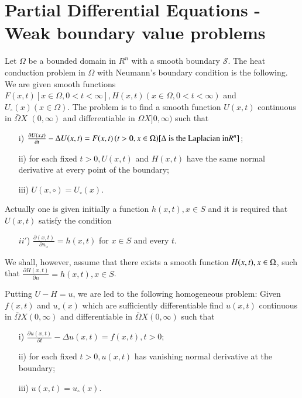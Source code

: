 
\chapter[Partial Differential Equations - Weak boundary...]{Partial Differential Equations - Weak boundary value
  problems}\label{chap10}


Let $\Omega$ be a bounded domain in $R^n$ with a smooth boundary
$\mathcal{S}$. The heat conduction problem in $\Omega$ with Neumann's
boundary condition is the following. We are given smooth functions
$F(x, t) [x \in \Omega, 0 < t < \infty], H (x, t) (x \in \Omega, 0 < t
< \infty)$ and $U_\circ (x) (x \in \Omega)$. The problem is to find a
smooth function $U(x, t)$ continuous in $\bar{\Omega} X$ $(0, \infty)$
and differentiable in $\Omega X ] 0, \infty )$ such that 
\begin{itemize}
\item [i)] $\frac{\partial U(x, t)}{\partial t}-\Delta U(x,t)=F(x,t)
 \, (t>0, x \in \Omega) [\Delta \mbox{ is the Laplacian in}\break R^n]$;
\item [ii)] for each fixed $t > 0, U(x, t)$ and $H(x, t)$ have the
  same normal derivative at every point of the boundary;
\item [iii)] $U(x, \circ) = U_\circ(x)$. 
\end{itemize}
 Actually one is
given initially a function $h(x, t), x \in S$ and it is required that
$U(x, t)$ satisfy the condition 
\begin{itemize}
\item [$ii'$)] $\frac{\partial (x, t)}{\partial n_x}= h(x, t)$ for $x
  \in S$ and every $t$.
\end{itemize}
We shall, however, assume that there exists a smooth function $H(x,
t),\break x \in \Omega$, such that $\frac{\partial H(x, t)}{\partial n}=
h(x,t), x \in S$.

Putting $U - H = u$, we are led to the following homogeneous problem:
Given $f(x, t)$ and $u_\circ(x)$ which are sufficiently differentiable
find $u(x, t)$ continuous in $\bar{\Omega} X(0, \infty)$ and differentiable
in $\bar{\Omega} X(0, \infty)$ such that
\begin{itemize}
\item[i)] $\frac{\partial u(x, t)}{\partial t}-\Delta u(x, t)=f(x, t),
  t > 0$;\pageoriginale
\item [ii)] for each fixed $t > 0, u(x, t)$ has vanishing normal
  derivative at the boundary;
\item [iii)] $u(x, t) = u_\circ(x)$.
\end{itemize}

